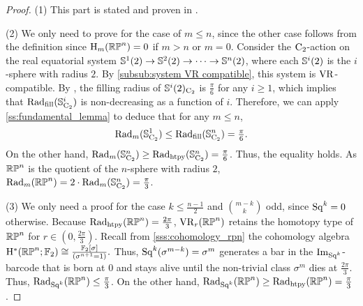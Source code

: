 \begin{proof}
	(1) This part is stated and proven in \cite[Thm.~4.5]{adams2022metric}.

	\smallskip (2) We only need to prove for the case of $m\leq n$, since the other case follows from the definition since \(\mathrm{H}_m(\mathbb{RP}^n) = 0\) if \(m > n\) or \(m = 0\).
    Consider the \(\mathrm{C}_2\)-action on the real equatorial system \(\mathbb{S}^{1}(2) \to \mathbb{S}^{2}(2) \to \dotsb \to \mathbb{S}^{n}(2)\), where each $\mathbb{S}^{i}(2)$ is the $i$-sphere with radius $2$.
    By \cref{subsub:system VR compatible}, this system is \(\mathrm{VR}\)-compatible.
    By \cite{katz1983filling}, the filling radius of $\mathbb{S}^{i}(2)_{\mathrm{C}_2}$ is $\frac{\pi}{6}$ for any $i \geq 1$, which implies that $\mathrm{Rad}_{\mathrm{fill}}(\mathbb{S}^{i}_{\mathrm{C}_2})$ is non-decreasing as a function of \(i\).
    Therefore, we can apply \cref{ss:fundamental_lemma} to deduce that for any \(m \leq n\),
    \[
    \mathrm{Rad}_{m}(\mathbb{S}^{1}_{\mathrm{C}_2}) \leq \mathrm{Rad}_{\mathrm{fill}}(\mathbb{S}^{n}_{\mathrm{C}_2}) = \tfrac{\pi}{6}.
    \]
    On the other hand, $\mathrm{Rad}_{m}(\mathbb{S}^{n}_{\mathrm{C}_2})\geq \mathrm{Rad}_{\mathrm{htpy}}(\mathbb{S}^{n}_{\mathrm{C}_2}) = \tfrac{\pi}{6}$.
    Thus, the equality holds.
    As $\mathbb{RP}^n$ is the quotient of the $n$-sphere with radius $2$, $\mathrm{Rad}_{m}(\mathbb{RP}^n) = 2\cdot \mathrm{Rad}_{m}(\mathbb{S}^{n}_{\mathrm{C}_2}) = \frac{\pi}{3}$.
    

	\smallskip (3) We only need a proof for the case $k \leq \frac{n-1}{2}$ and $\binom{m-k}{k}$ odd, since \(\mathrm{Sq}^k = 0\) otherwise.
	Because $\mathrm{Rad}_{\mathrm{htpy}}(\mathbb{RP}^n)=\frac{2\pi}{3}$, $\mathrm{VR}_r(\mathbb{RP}^n)$ retains the homotopy type of $\mathbb{RP}^n$ for $r \in (0,\tfrac{2\pi}{3})$.
    Recall from \cref{sss:cohomology_rpn} the cohomology algebra \(\mathrm{H}^\ast(\mathbb{RP}^n; {\mathbb{F}_2}) \cong \frac{{\mathbb{F}_2}[\sigma]}{(\sigma^{n+1} = 1)}.\)
    Thus, $\mathrm{Sq}^k(\sigma^{m-k}) = \sigma^{m}$ generates a bar in the $\operatorname{Im}_{\mathrm{Sq}^k}$-barcode that is born at $0$ and stays alive until the non-trivial class $\sigma^{m}$ dies at $\tfrac{2\pi}{3}$.
	Thus, $\mathrm{Rad}_{\mathrm{Sq}^k}(\mathbb{RP}^n) \leq \tfrac{\pi}{3}$.
	On the other hand, $\mathrm{Rad}_{\mathrm{Sq}^k}(\mathbb{RP}^n) \geq \mathrm{Rad}_{\mathrm{htpy}}(\mathbb{RP}^n) = \tfrac{\pi}{3}$.
\end{proof}

